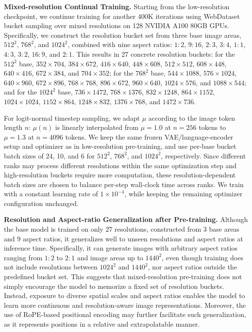 \documentclass{llmxive}
\begin{document}
\noindent\textbf{Mixed-resolution Continual Training.} Starting from the low-resolution checkpoint, we continue training for another 400K iterations using WebDataset bucket sampling over mixed resolutions on 128 NVIDIA A100 80GB GPUs. Specifically, we construct the resolution bucket set from three base image areas, $512^2$, $768^2$, and $1024^2$, combined with nine aspect ratios: $1{:}2$, $9{:}16$, $2{:}3$, $3{:}4$, $1{:}1$, $4{:}3$, $3{:}2$, $16{:}9$, and $2{:}1$. This results in 27 concrete resolution buckets: for the $512^2$ base, $352\times704$, $384\times672$, $416\times640$, $448\times608$, $512\times512$, $608\times448$, $640\times416$, $672\times384$, and $704\times352$; for the $768^2$ base, $544\times1088$, $576\times1024$, $640\times960$, $672\times896$, $768\times768$, $896\times672$, $960\times640$, $1024\times576$, and $1088\times544$; and for the $1024^2$ base, $736\times1472$, $768\times1376$, $832\times1248$, $864\times1152$, $1024\times1024$, $1152\times864$, $1248\times832$, $1376\times768$, and $1472\times736$.

For logit-normal timestep sampling, we adapt $\mu$ according to the image token length $n$: $\mu(n)$ is linearly interpolated from $\mu{=}1.0$ at $n{=}256$ tokens to $\mu{=}1.3$ at $n{=}4096$ tokens. We keep the same frozen VAE/language-encoder setup and optimizer as in low-resolution pre-training, and use per-base bucket batch sizes of 24, 10, and 6 for $512^2$, $768^2$, and $1024^2$, respectively. Since different ranks may process different resolutions within the same optimization step and high-resolution buckets require more computation, these resolution-dependent batch sizes are chosen to balance per-step wall-clock time across ranks. We train with a constant learning rate of $1\times10^{-4}$, while keeping the remaining optimizer configuration unchanged.



\noindent\textbf{Resolution and Aspect-ratio Generalization after Pre-training.}
Although the base model is trained on only 27 resolutions, constructed from 3 base areas and 9 aspect ratios, it generalizes well to unseen resolutions and aspect ratios at inference time. Specifically, it can generate images with arbitrary aspect ratios ranging from $1{:}2$ to $2{:}1$ and image areas up to $1440^2$, even though training does not include resolutions between $1024^2$ and $1440^2$, nor aspect ratios outside the predefined bucket set. This suggests that mixed-resolution pre-training does not simply encourage the model to memorize a fixed set of resolution buckets. Instead, exposure to diverse spatial scales and aspect ratios enables the model to learn more continuous and resolution-aware image representations. Moreover, the use of RoPE-based positional encoding may further facilitate such generalization, as it represents positions in a relative and extrapolatable manner.
\end{document}

